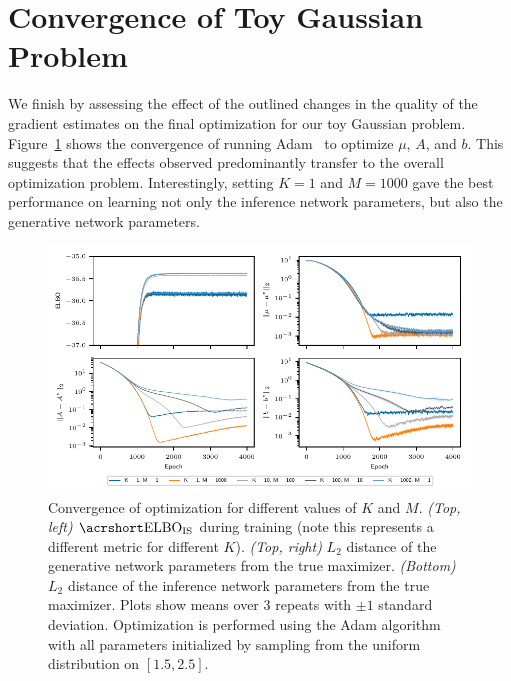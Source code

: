 
\section{Convergence of Toy Gaussian Problem}
\label{sec:app:toy-Gauss}

We finish by assessing the effect of the outlined changes in the quality
of the gradient estimates on the final optimization for our toy Gaussian problem.  Figure~\ref{fig:snr/hd_gaussian}
shows the convergence of running Adam~\citep{Kingma2014adam} to optimize $\mu$, $A$, 
and $b$.  This suggests that the effects observed predominantly transfer to the overall
optimization problem.  Interestingly, setting $K=1$ and $M=1000$ gave the best performance
on learning not only the inference network parameters, but also the generative network
parameters.
\begin{figure}[h]
	\includegraphics[width=\textwidth]{figures/tighter_bounds/hd_gaussian.pdf}
	\caption{Convergence of optimization for different values of $K$ and $M$. 
		\emph{(Top, left)} $\ELBO_{\text{IS}}$ during training
		(note this represents a different metric for different $K$). \emph{(Top, right)} $L_2$ distance of the generative network parameters from the true maximizer. \emph{(Bottom)} $L_2$ distance of the inference network parameters from the true maximizer. Plots show means over $3$ repeats with $\pm 1$ standard deviation. Optimization is performed using the Adam algorithm with all parameters initialized by sampling from the uniform distribution on $[1.5, 2.5]$.}
	\label{fig:snr/hd_gaussian}
\end{figure}